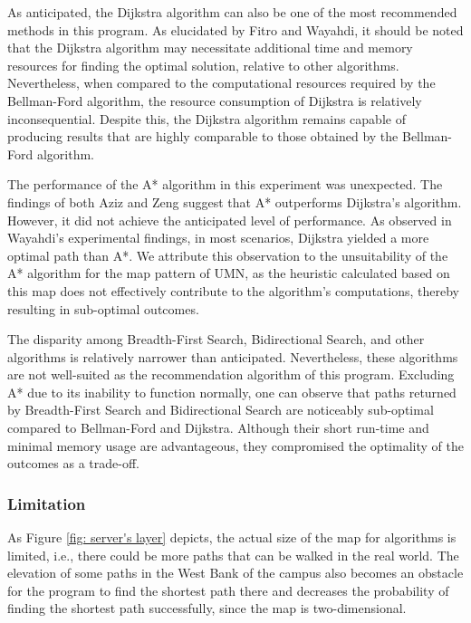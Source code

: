 \documentclass[12pt]{article}
\begin{document}
As anticipated, the Dijkstra algorithm can also be one of the most recommended methods in this program. As elucidated by Fitro\cite{Fitro_2018} and Wayahdi\cite{Wayahdi_2021_GreedyAA}, it should be noted that the Dijkstra algorithm may necessitate additional time and memory resources for finding the optimal solution, relative to other algorithms. Nevertheless, when compared to the computational resources required by the Bellman-Ford algorithm, the resource consumption of Dijkstra is relatively inconsequential. Despite this, the Dijkstra algorithm remains capable of producing results that are highly comparable to those obtained by the Bellman-Ford algorithm.

The performance of the A* algorithm in this experiment was unexpected. The findings of both Aziz\cite{Aziz_Anusha_Sheikh_2022} and Zeng\cite{Zeng_Church_2009} suggest that A* outperforms Dijkstra's algorithm. However, it did not achieve the anticipated level of performance. As observed in Wayahdi's experimental findings\cite{Wayahdi_2021_GreedyAA}, in most scenarios, Dijkstra yielded a more optimal path than A*. We attribute this observation to the unsuitability of the A* algorithm for the map pattern of UMN, as the heuristic calculated based on this map does not effectively contribute to the algorithm's computations, thereby resulting in sub-optimal outcomes.

The disparity among Breadth-First Search, Bidirectional Search, and other algorithms is relatively narrower than anticipated. Nevertheless, these algorithms are not well-suited as the recommendation algorithm of this program. Excluding A* due to its inability to function normally, one can observe that paths returned by Breadth-First Search and Bidirectional Search are noticeably sub-optimal compared to Bellman-Ford and Dijkstra. Although their short run-time and minimal memory usage are advantageous, they compromised the optimality of the outcomes as a trade-off.


\subsubsection{Limitation}

As Figure \ref{fig: server's layer} depicts, the actual size of the map for algorithms is limited, i.e., there could be more paths that can be walked in the real world. The elevation of some paths in the West Bank of the campus also becomes an obstacle for the program to find the shortest path there and decreases the probability of finding the shortest path successfully, since the map is two-dimensional.
\end{document}
